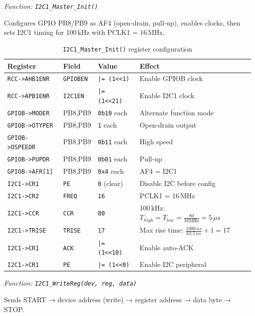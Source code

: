 \documentclass[12pt,a4paper]{article}
\begin{document}
\textit{Function: \texttt{I2C1\_Master\_Init()}}

Configures GPIO PB8/PB9 as AF4 (open-drain, pull-up), enables clocks, then sets I2C1 timing for 100\,kHz with PCLK1 = 16\,MHz.

\begin{table}[H]
\centering
\begin{tabular}{llll}
\hline
\textbf{Register} & \textbf{Field} & \textbf{Value} & \textbf{Effect} \\
\hline
\texttt{RCC->AHB1ENR} & \texttt{GPIOBEN} & \texttt{|= (1<<1)} & Enable GPIOB clock \\
\texttt{RCC->APB1ENR} & \texttt{I2C1EN}  & \texttt{|= (1<<21)} & Enable I2C1 clock \\
\texttt{GPIOB->MODER} & PB8,PB9 & \texttt{0b10} each & Alternate function mode \\
\texttt{GPIOB->OTYPER} & PB8,PB9 & \texttt{1} each & Open-drain output \\
\texttt{GPIOB->OSPEEDR} & PB8,PB9 & \texttt{0b11} each & High speed \\
\texttt{GPIOB->PUPDR} & PB8,PB9 & \texttt{0b01} each & Pull-up \\
\texttt{GPIOB->AFR[1]} & PB8,PB9 & \texttt{0x4} each & AF4 = I2C1 \\
\texttt{I2C1->CR1} & \texttt{PE} & \texttt{0} (clear) & Disable I2C before config \\
\texttt{I2C1->CR2} & \texttt{FREQ} & \texttt{16} & PCLK1 = 16\,MHz \\
\texttt{I2C1->CCR} & \texttt{CCR} & \texttt{80} & 100\,kHz: \(T_{high}=T_{low}=\frac{80}{16\text{MHz}}=5\,\mu s\) \\
\texttt{I2C1->TRISE} & \texttt{TRISE} & \texttt{17} & Max rise time: \(\frac{1000\,ns}{62.5\,ns}+1=17\) \\
\texttt{I2C1->CR1} & \texttt{ACK} & \texttt{|= (1<<10)} & Enable auto-ACK \\
\texttt{I2C1->CR1} & \texttt{PE} & \texttt{|= (1<<0)} & Enable I2C peripheral \\
\hline
\end{tabular}
\caption{\texttt{I2C1\_Master\_Init()} register configuration}
\end{table}

\textit{Function: \texttt{I2C1\_WriteReg(dev, reg, data)}}

Sends START → device address (write) → register address → data byte → STOP.
\end{document}
